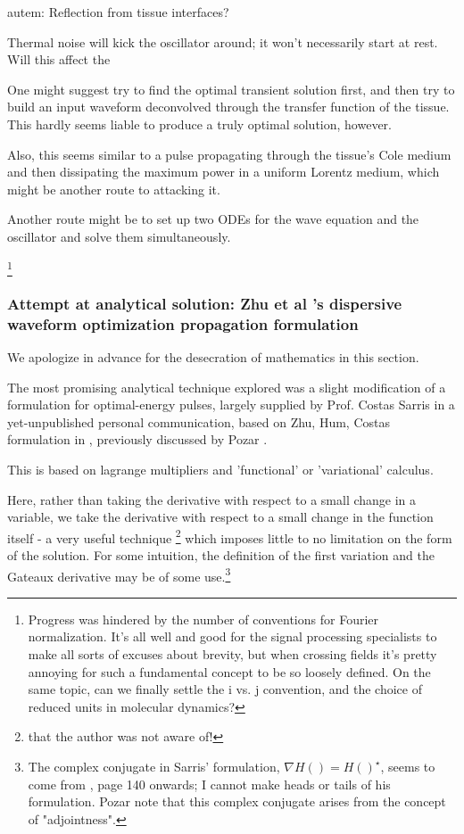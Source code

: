 \documentclass[paper.tex]{subfiles}
\begin{document}
\begin{autem}
	autem: 
Reflection from tissue interfaces?

Thermal noise will kick the oscillator around; it won't necessarily start at rest. Will this affect the 
\end{autem}

One might suggest try to find the optimal transient solution first, and then try to build an input waveform deconvolved through the  transfer function of the tissue. This hardly seems liable to produce a truly optimal solution, however.


Also, this seems similar to a pulse propagating through the tissue's Cole medium and then dissipating the maximum power in a uniform Lorentz medium, which might be another route to attacking it.

Another route might be to set up two ODEs for the wave equation and the oscillator and solve them simultaneously.

\footnote{Progress was hindered by the number of conventions for Fourier normalization. It's all well and good for the signal processing specialists to make all sorts of excuses about brevity, but when crossing fields it's pretty annoying for such a fundamental concept to be so loosely defined. On the same topic, can we finally settle the i vs. j convention, and the choice of reduced units in molecular dynamics?}


\subsubsection{Attempt at analytical solution: Zhu et al 's dispersive waveform optimization propagation formulation}

We apologize in advance for the desecration of mathematics in this section.

The most promising analytical technique explored was a slight modification of a formulation for optimal-energy pulses, largely supplied by Prof. Costas Sarris in a yet-unpublished personal communication, based on Zhu, Hum, Costas formulation in \cite{Microwave2012b}, previously discussed by Pozar \cite{Waveform2003}. 

This is based on lagrange multipliers and 'functional' or 'variational' calculus\cite{Methods1989}. 

Here, rather than taking the derivative with respect to a small change in a variable, we take the derivative with respect to a small change in the function itself - a very useful technique \footnote{that the author was not aware of!} which imposes little to no limitation on the form of the solution. For some intuition, the definition of the first variation and the Gateaux derivative may be of some use.\footnote{The complex conjugate in Sarris' formulation, $\nabla H() = H()^\star$, seems to come from \cite{Signal1969}, page 140 onwards; I cannot make heads or tails of his formulation. Pozar note that this complex conjugate arises from the concept of "adjointness".}
\end{document}
